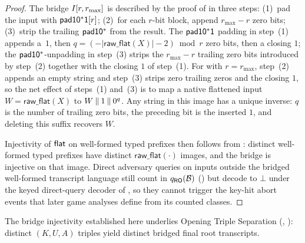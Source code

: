 \begin{proof}
The bridge $I[r, r_{\max}]$ is described by the proof of
\cite[Theorem~3]{BDPV11} in three steps: (1)~pad the input with
$\mathsf{pad10^*1}[r]$; (2)~for each $r$-bit block, append $r_{\max} - r$
zero bits; (3)~strip the trailing $\mathsf{pad10^*}$ from the result. The
$\mathsf{pad10^*1}$ padding in step~(1) appends a~$1$, then
$q = (-|\mathsf{raw\_flat}(X)| - 2) \bmod r$ zero bits, then a closing
$1$; the $\mathsf{pad10^*}$-unpadding in step~(3) strips the $r_{\max} - r$
trailing zero bits introduced by step~(2) together with the closing
$1$ of step~(1). For \TW{} with $r = r_{\max}$, step~(2) appends an
empty string and step~(3) strips zero trailing zeros and the closing
$1$, so the net effect of steps~(1) and~(3) is to map a native flattened
input $W = \mathsf{raw\_flat}(X)$ to $W \mathbin{\|} 1 \mathbin{\|} 0^q$. Any
string in this image has a unique inverse: $q$ is the number of trailing
zero bits, the preceding bit is the inserted $1$, and deleting this
suffix recovers $W$.

Injectivity of $\mathsf{flat}$ on well-formed typed \TW{} prefixes then
follows from : distinct well-formed typed
prefixes have distinct
$\mathsf{raw\_flat}(\cdot)$ images, and the bridge is injective on
that image. Direct adversary queries on inputs outside the bridged
\TW{} well-formed transcript language still count in $q_{\mathsf{RO}}(\mathcal{B})$
() but decode to $\bot$ under the keyed
direct-query decoder of , so they cannot trigger
the key-hit abort events that later game analyses define from its
counted classes.
\end{proof}

The bridge injectivity established here underlies Opening Triple
Separation (, ): distinct
$(K, U, A)$ triples yield distinct bridged final root transcripts.

